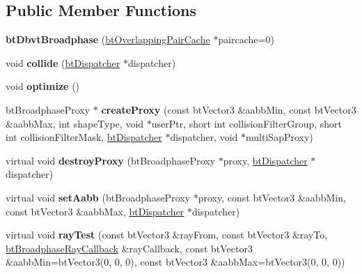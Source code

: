\subsection*{Public Member Functions}
\begin{DoxyCompactItemize}
\item 
\hypertarget{structbt_dbvt_broadphase_a8a7d83c74abbacde98e22f16eebed62c}{{\bfseries bt\+Dbvt\+Broadphase} (\hyperlink{classbt_overlapping_pair_cache}{bt\+Overlapping\+Pair\+Cache} $\ast$paircache=0)}\label{structbt_dbvt_broadphase_a8a7d83c74abbacde98e22f16eebed62c}

\item 
\hypertarget{structbt_dbvt_broadphase_a3885d96310bbc87422c5b4b5f35db7e9}{void {\bfseries collide} (\hyperlink{classbt_dispatcher}{bt\+Dispatcher} $\ast$dispatcher)}\label{structbt_dbvt_broadphase_a3885d96310bbc87422c5b4b5f35db7e9}

\item 
\hypertarget{structbt_dbvt_broadphase_a63bb26aa6b0ad6e91c5fbc938358d93b}{void {\bfseries optimize} ()}\label{structbt_dbvt_broadphase_a63bb26aa6b0ad6e91c5fbc938358d93b}

\item 
\hypertarget{structbt_dbvt_broadphase_a62f29aee3e22e2e3cafcda46265353de}{bt\+Broadphase\+Proxy $\ast$ {\bfseries create\+Proxy} (const bt\+Vector3 \&aabb\+Min, const bt\+Vector3 \&aabb\+Max, int shape\+Type, void $\ast$user\+Ptr, short int collision\+Filter\+Group, short int collision\+Filter\+Mask, \hyperlink{classbt_dispatcher}{bt\+Dispatcher} $\ast$dispatcher, void $\ast$multi\+Sap\+Proxy)}\label{structbt_dbvt_broadphase_a62f29aee3e22e2e3cafcda46265353de}

\item 
\hypertarget{structbt_dbvt_broadphase_a21ba695c249dac8919b4a3cc2c053d8e}{virtual void {\bfseries destroy\+Proxy} (bt\+Broadphase\+Proxy $\ast$proxy, \hyperlink{classbt_dispatcher}{bt\+Dispatcher} $\ast$dispatcher)}\label{structbt_dbvt_broadphase_a21ba695c249dac8919b4a3cc2c053d8e}

\item 
\hypertarget{structbt_dbvt_broadphase_aeb9fdc20e198ded65a6aa8616b4873b4}{virtual void {\bfseries set\+Aabb} (bt\+Broadphase\+Proxy $\ast$proxy, const bt\+Vector3 \&aabb\+Min, const bt\+Vector3 \&aabb\+Max, \hyperlink{classbt_dispatcher}{bt\+Dispatcher} $\ast$dispatcher)}\label{structbt_dbvt_broadphase_aeb9fdc20e198ded65a6aa8616b4873b4}

\item 
\hypertarget{structbt_dbvt_broadphase_a8d384e420a20ab64c1d3fac0ee12563a}{virtual void {\bfseries ray\+Test} (const bt\+Vector3 \&ray\+From, const bt\+Vector3 \&ray\+To, \hyperlink{structbt_broadphase_ray_callback}{bt\+Broadphase\+Ray\+Callback} \&ray\+Callback, const bt\+Vector3 \&aabb\+Min=bt\+Vector3(0, 0, 0), const bt\+Vector3 \&aabb\+Max=bt\+Vector3(0, 0, 0))}\label{structbt_dbvt_broadphase_a8d384e420a20ab64c1d3fac0ee12563a}


\end{DoxyCompactItemize}

